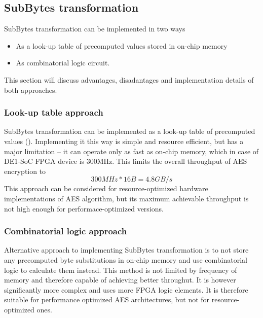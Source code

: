 \subsection{SubBytes transformation}
\label{sec:sub-bytes}

SubBytes transformation can be implemented in two ways
\begin{itemize}[nolistsep]
\item As a look-up table of precomputed values stored in on-chip memory
\item As combinatorial logic circuit.
\end{itemize}
This section will discuss advantages, disadantages and implementation details of both approaches.

\subsubsection{Look-up table approach}
SubBytes transformation can be implemented as a look-up table of precomputed values (\cite[Fig. 7]{aes-standard}). Implementing it this way is simple and resource efficient, but has a major limitation -- it can operate only as fast as on-chip memory, which in case of DE1-SoC FPGA device is 300MHz. This limits the overall throughput of AES encryption to
$$
300MHz * 16B = 4.8GB/s
$$
This approach can be considered for resource-optimized hardware implementations of AES algorithm, but its maximum achievable throughput is not high enough for performace-optimized versions.


\subsubsection{Combinatorial logic approach}
\label{sec:comb-theory}
Alternative approach to implementing SubBytes transformation is to not store any precomputed byte substitutions in on-chip memory and use combinatorial logic to calculate them instead. This method is not limited by frequency of memory and therefore capable of achieving better throughut. It is however significantly more complex and uses more FPGA logic elements. It is therefore suitable for performance optimized AES architectures, but not for resource-optimized ones.

